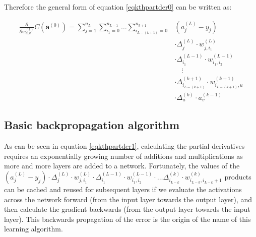 \documentclass[titlepage]{article}
\begin{document}
          Therefore the general form of equation \ref{eqkthpartder0} can be
          written as:

          \begin{equation}\label{eqkthpartder1}
            \begin{split}
              \frac{\partial}{\partial w_{u,v}^{(k)}}
                C \left( \mathbf{a}^{(0)} \right)
                    = \sum_{j=1}^{n_L}
                        \sum_{i_1=0}^{n_{L-1}}
                          \ldots
                          \sum_{i_{L-(k+1)}=0}^{n_{k+1}}
                            & \left( a_j^{(L)} - y_j \right) \\
                            & \cdot
                              \Delta_j^{(L)}
                              \cdot
                              w_{j,i_1}^{(L)} \\
                            & \cdot
                              \Delta_{i_1}^{(L-1)}
                              \cdot
                              w_{i_1,i_2}^{(L-1)} \\
                            & \quad \vdots \\
                            & \cdot
                              \Delta_{i_{L-(k+1)}}^{(k+1)}
                              \cdot
                              w_{i_{L-(k+1)},u}^{(k+1)} \\
                            & \cdot
                              \Delta_u^{(k)}
                              \cdot
                              a_v^{(k-1)}
            \end{split}
          \end{equation}

\newpage

    \subsection{Basic backpropagation algorithm}

      As can be seen in equation \ref{eqkthpartder1}, calculating the partial
      derivatives requires an exponentially growing number of additions and
      multiplications as more and more layers are added to a network.
      Fortunately, the values of the
      $
        \left( a_j^{(L)} - y_j \right)
        \cdot
        \Delta_j^{(L)}
        \cdot
        w_{j,i_1}^{(L)}
        \cdot
        \Delta_{i_1}^{(L-1)}
        \cdot
        w_{i_1,i_2}^{(L-1)}
        \cdot
        \ldots
        \Delta_{i_{L-k}}^{(k)}
        \cdot
        w_{i_{L-k},i_{L-k}+1}^{(k)}
      $ products can be cached and reused for subsequent layers if we evaluate
      the activations across the network forward (from the input layer towards
      the output layer), and then calculate the gradient backwards (from the
      output layer towards the input layer). This backwards propagation of the
      error is the origin of the name of this learning algorithm.
\end{document}
